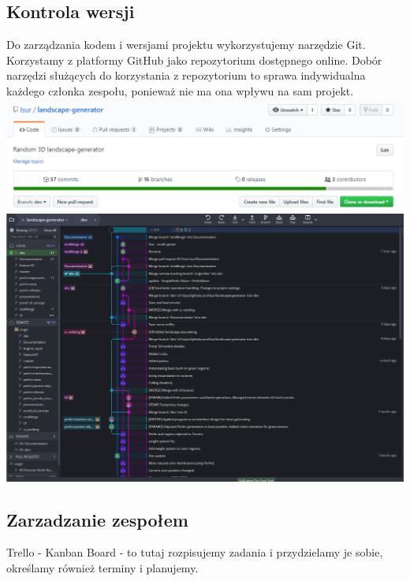 \documentclass[12pt,a4paper]{article}
\begin{document}
\subsection{Kontrola wersji}
Do zarządzania kodem i wersjami projektu wykorzystujemy narzędzie Git. Korzystamy z platformy GitHub jako repozytorium dostępnego online. Dobór narzędzi służących do korzystania z repozytorium to sprawa indywidualna każdego członka zespołu, ponieważ nie ma ona wpływu na sam projekt.
\includegraphics[width=\textwidth]{Images/git.png}
\includegraphics[width=\textwidth]{Images/gitKraken.png}
\newpage
\subsection{Zarzadzanie zespołem}
Trello - Kanban Board - to tutaj rozpisujemy zadania i przydzielamy je sobie, określamy również terminy i planujemy.\\
\end{document}

